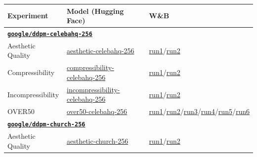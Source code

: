 \begin{appendixs}
    \begin{table}[h!]
        \centering
        \begin{tabular}{l l l}
            \toprule
            \textbf{Experiment} & \textbf{Model (Hugging Face)} & \textbf{W\&B} \\
            \midrule
            \multicolumn{3}{l}{\href{https://huggingface.co/google/ddpm-celebahq-256}{\textbf{\texttt{google/ddpm-celebahq-256}}}} \\
            \hline
            Aesthetic Quality & \href{https://huggingface.co/alkzar90/ddpo-aesthetic-celebahq-256}{aesthetic-celebahq-256}  & \href{https://wandb.ai/alcazar90/ddpo-aesthetic-ddpm-celebahq256/runs/d5jb3r8a}{run1}/\href{https://wandb.ai/alcazar90/ddpo-aesthetic-ddpm-celebahq256/runs/cfltp5ln}{run2} \\
            Compressibility & \href{https://huggingface.co/alkzar90/ddpo-compressibility-celebahq-256}{compressibility-celebahq-256} & \href{https://wandb.ai/alcazar90/ddpo-compressibility-ddpm-celebahq256/runs/eu71d08t}{run1}/\href{https://wandb.ai/alcazar90/ddpo-compressibility-ddpm-celebahq256/runs/r2mxiasx}{run2} \\
            Incompressibility  & \href{https://huggingface.co/alkzar90/ddpo-incompressibility-celebahq-256}{incompressibility-celebahq-256} & \href{https://wandb.ai/alcazar90/ddpo-incompressibility-ddpm-celebahq256/runs/3gz13ov7}{run1}/\href{https://wandb.ai/alcazar90/ddpo-incompressibility-ddpm-celebahq256/runs/b1srfre3}{run2} \\
            OVER50 & \href{https://huggingface.co/alkzar90/ddpo-over50-celebahq-256}{over50-celebahq-256} & \href{https://wandb.ai/alcazar90/ddpo-over50-ddpm-celebahq256/runs/3x6sr17l}{run1}/\href{https://wandb.ai/alcazar90/ddpo-over50-ddpm-celebahq256/runs/xfwb9vok}{run2}/\href{https://wandb.ai/alcazar90/ddpo-over50-ddpm-celebahq256/runs/4422n639}{run3}/\href{https://wandb.ai/alcazar90/ddpo-over50-ddpm-celebahq256/runs/dbmjb1s6}{run4}/\href{https://wandb.ai/alcazar90/ddpo-over50-ddpm-celebahq256/runs/qfjzj6rd}{run5}/\href{https://wandb.ai/alcazar90/ddpo-over50-ddpm-celebahq256/runs/b7wu16pl}{run6}\\
            \multicolumn{3}{l}{\href{https://huggingface.co/google/ddpm-church-256}{\textbf{\texttt{google/ddpm-church-256}}}} \\
            \hline
            Aesthetic Quality & \href{https://huggingface.co/alkzar90/ddpo-aesthetic-church-256}{aesthetic-church-256} & \href{https://wandb.ai/alcazar90/ddpo-aesthetic-ddpm-church256/runs/5f69185v}{run1}/\href{https://wandb.ai/alcazar90/ddpo-aesthetic-ddpm-church256/runs/4uqt5dwa}{run2} \\

\end{tabular}
\end{table}
\end{appendixs}
